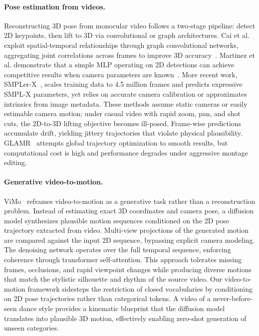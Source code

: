 \paragraph{Pose estimation from videos.}
Reconstructing 3D pose from monocular video follows a two-stage pipeline: detect 2D keypoints, then lift to 3D via convolutional or graph architectures. Cai et al. exploit spatial-temporal relationships through graph convolutional networks, aggregating joint correlations across frames to improve 3D accuracy~\cite{gcnpose2019}. Martinez et al. demonstrate that a simple MLP operating on 2D detections can achieve competitive results when camera parameters are known~\cite{poseest2017}. More recent work, SMPLer-X~\cite{smpl2024}, scales training data to 4.5 million frames and predicts expressive SMPL-X parameters, yet relies on accurate camera calibration or approximates intrinsics from image metadata. These methods assume static cameras or easily estimable camera motion; under casual video with rapid zoom, pan, and shot cuts, the 2D-to-3D lifting objective becomes ill-posed. Frame-wise predictions accumulate drift, yielding jittery trajectories that violate physical plausibility. GLAMR~\cite{glamr2022} attempts global trajectory optimization to smooth results, but computational cost is high and performance degrades under aggressive montage editing.

\paragraph{Generative video-to-motion.}
ViMo~\cite{vimo2024} reframes video-to-motion as a generative task rather than a reconstruction problem. Instead of estimating exact 3D coordinates and camera pose, a diffusion model synthesizes plausible motion sequences conditioned on the 2D pose trajectory extracted from video. Multi-view projections of the generated motion are compared against the input 2D sequence, bypassing explicit camera modeling. The denoising network operates over the full temporal sequence, enforcing coherence through transformer self-attention. This approach tolerates missing frames, occlusions, and rapid viewpoint changes while producing diverse motions that match the stylistic silhouette and rhythm of the source video. Our video-to-motion framework sidesteps the restriction of closed vocabularies by conditioning on 2D pose trajectories rather than categorical tokens. A video of a never-before-seen dance style provides a kinematic blueprint that the diffusion model translates into plausible 3D motion, effectively enabling zero-shot generation of unseen categories.

